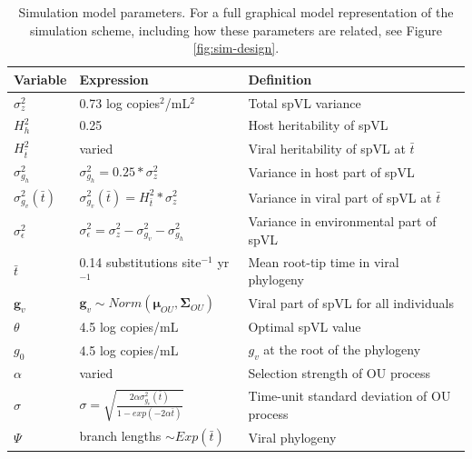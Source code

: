 \documentclass[11pt]{article} %
\providecommand{\DIFadd}[1]{{\protect\color{blue}\uwave{#1}}} %
\providecommand{\DIFdel}[1]{{\protect\color{red}\sout{#1}}}                      %
\providecommand{\DIFaddend}{} %
\providecommand{\DIFaddFL}[1]{\DIFadd{#1}} %
\providecommand{\DIFdelFL}[1]{\DIFdel{#1}} %
\providecommand{\DIFaddbeginFL}{} %
\providecommand{\DIFaddendFL}{} %
\providecommand{\DIFdelbeginFL}{} %
\providecommand{\DIFdelendFL}{} %
\newcommand{\DIFscaledelfig}{0.5}
\newlength{\DIFdelgraphicswidth} %
\newlength{\DIFdelgraphicsheight} %
\newcommand{\DIFaddincludegraphics}[2][]{{\color{blue}\fbox{\DIFOincludegraphics[#1]{#2}}}} %
\newcommand{\DIFdelincludegraphics}[2][]{%
\sbox{\DIFdelgraphicsbox}{\DIFOincludegraphics[#1]{#2}}%
\settoboxwidth{\DIFdelgraphicswidth}{\DIFdelgraphicsbox} %
\settoboxtotalheight{\DIFdelgraphicsheight}{\DIFdelgraphicsbox} %
\scalebox{\DIFscaledelfig}{%
\parbox[b]{\DIFdelgraphicswidth}{\usebox{\DIFdelgraphicsbox}\\[-\baselineskip] \rule{\DIFdelgraphicswidth}{0em}}\llap{\resizebox{\DIFdelgraphicswidth}{\DIFdelgraphicsheight}{%
\setlength{\unitlength}{\DIFdelgraphicswidth}%
\begin{picture}(1,1)%
\thicklines\linethickness{2pt} %
{\color[rgb]{1,0,0}\put(0,0){\framebox(1,1){}}}%
{\color[rgb]{1,0,0}\put(0,0){\line( 1,1){1}}}%
{\color[rgb]{1,0,0}\put(0,1){\line(1,-1){1}}}%
\end{picture}%
}\hspace*{3pt}}} %
} %
\DeclareRobustCommand{\DIFaddend}{\DIFOaddend \let\includegraphics\DIFOincludegraphics} %
\DeclareRobustCommand{\DIFaddbeginFL}{\DIFOaddbeginFL \let\includegraphics\DIFaddincludegraphics} %
\DeclareRobustCommand{\DIFaddendFL}{\DIFOaddendFL \let\includegraphics\DIFOincludegraphics} %
\DeclareRobustCommand{\DIFdelbeginFL}{\DIFOdelbeginFL \let\includegraphics\DIFdelincludegraphics} %
\DeclareRobustCommand{\DIFdelendFL}{\DIFOaddendFL \let\includegraphics\DIFOincludegraphics} %
\begin{document}
\begin{linenumbers}
\DIFaddend \begin{table}[H]
	\caption{Simulation model parameters. For a full graphical model representation of the simulation scheme, including how these parameters are related, see Figure \ref{fig:sim-design}.}
	\begin{tabularx}{\linewidth}{p{1.5cm}ll} \toprule 
		Variable & Expression & Definition \\ \midrule 
		$\sigma^2_z$ &  0.73 log copies$^{2}$/mL$^{2}$ & Total spVL variance \\ 
		$H^2_h$ & 0.25 & Host heritability of spVL \\
		$H^2_{\bar{t}}$ & varied & Viral heritability of spVL at $\bar{t}$ \\
		\DIFdelbeginFL \DIFdelFL{$\sigma^2_{g_h}$ }\DIFdelendFL \DIFaddbeginFL \DIFaddFL{$\sigma^2_{h}$ }\DIFaddendFL & \DIFdelbeginFL \DIFdelFL{$\sigma_{g_h}^2 = 0.25*\sigma_z^2$ }\DIFdelendFL \DIFaddbeginFL \DIFaddFL{$\sigma_{h}^2 = 0.25*\sigma_z^2$ }\DIFaddendFL & Variance in host part of spVL \\
		\DIFdelbeginFL \DIFdelFL{$\sigma^2_{g_v}(\bar{t})$ }\DIFdelendFL \DIFaddbeginFL \DIFaddFL{$\sigma^2_{p}(\bar{t})$ }\DIFaddendFL & $\sigma^2_{g_{v}}(\bar{t}) = H^2_{\bar{t}}*\sigma_z^2$ & Variance in viral part of spVL at $\bar{t}$ \\ 
		$\sigma^2_{\epsilon}$ & \DIFdelbeginFL \DIFdelFL{$\sigma_{\epsilon}^2 = \sigma_z^2 - \sigma^2_{g_v} - \sigma^2_{g_h}$ }\DIFdelendFL \DIFaddbeginFL \DIFaddFL{$\sigma_{\epsilon}^2 = \sigma_z^2 - \sigma^2_{p} - \sigma^2_{h}$ }\DIFaddendFL & Variance in environmental part of spVL \\ 
		$\bar{t}$ & 0.14 substitutions site$^{-1}$ yr$^{-1}$ & Mean root-tip time in viral phylogeny \\ 
		$\bm{g}_v$ & $\bm{g}_v \sim Norm(\bm{\mu}_{OU}, \boldsymbol{\Sigma}_{OU})$ & Viral part of spVL for all individuals \\ 
		$\theta$ & 4.5 log copies/mL & Optimal spVL value \\
		$g_{0}$ & 4.5 log copies/mL & \DIFdelbeginFL \DIFdelFL{$g_v$ }\DIFdelendFL \DIFaddbeginFL \DIFaddFL{$g$ }\DIFaddendFL at the root of the phylogeny  \\ 
		$\alpha$ & varied & Selection strength of OU process \\ 
		$\sigma$ & $\sigma = \sqrt{\frac{2\alpha\sigma^2_{g_{v}}(\bar{t})}{1 - exp(-2\alpha\bar{t})}}$ & Time-unit standard deviation of OU process \\ 
		$\Psi$ & branch lengths $\sim Exp(\bar{t})$ & Viral phylogeny \\ 

\end{tabularx}
\end{table}
\end{linenumbers}
\end{document}
